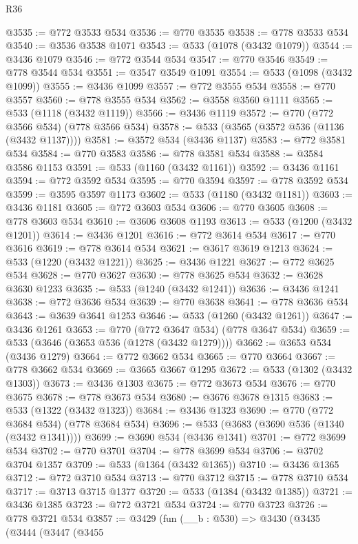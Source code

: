 \begin{lexlean}{R36}
\begin{coremodule}
@3535 := @772 @3533 @534
@3536 := @770 @3535
@3538 := @778 @3533 @534
@3540 := @3536 @3538 @1071
@3543 := @533 (@1078 (@3432 @1079))
@3544 := @3436 @1079
@3546 := @772 @3544 @534
@3547 := @770 @3546
@3549 := @778 @3544 @534
@3551 := @3547 @3549 @1091
@3554 := @533 (@1098 (@3432 @1099))
@3555 := @3436 @1099
@3557 := @772 @3555 @534
@3558 := @770 @3557
@3560 := @778 @3555 @534
@3562 := @3558 @3560 @1111
@3565 := @533 (@1118 (@3432 @1119))
@3566 := @3436 @1119
@3572 := @770 (@772 @3566 @534) (@778 @3566 @534)
@3578 := @533 (@3565 (@3572 @536 (@1136 (@3432 @1137))))
@3581 := @3572 @534 (@3436 @1137)
@3583 := @772 @3581 @534
@3584 := @770 @3583
@3586 := @778 @3581 @534
@3588 := @3584 @3586 @1153
@3591 := @533 (@1160 (@3432 @1161))
@3592 := @3436 @1161
@3594 := @772 @3592 @534
@3595 := @770 @3594
@3597 := @778 @3592 @534
@3599 := @3595 @3597 @1173
@3602 := @533 (@1180 (@3432 @1181))
@3603 := @3436 @1181
@3605 := @772 @3603 @534
@3606 := @770 @3605
@3608 := @778 @3603 @534
@3610 := @3606 @3608 @1193
@3613 := @533 (@1200 (@3432 @1201))
@3614 := @3436 @1201
@3616 := @772 @3614 @534
@3617 := @770 @3616
@3619 := @778 @3614 @534
@3621 := @3617 @3619 @1213
@3624 := @533 (@1220 (@3432 @1221))
@3625 := @3436 @1221
@3627 := @772 @3625 @534
@3628 := @770 @3627
@3630 := @778 @3625 @534
@3632 := @3628 @3630 @1233
@3635 := @533 (@1240 (@3432 @1241))
@3636 := @3436 @1241
@3638 := @772 @3636 @534
@3639 := @770 @3638
@3641 := @778 @3636 @534
@3643 := @3639 @3641 @1253
@3646 := @533 (@1260 (@3432 @1261))
@3647 := @3436 @1261
@3653 := @770 (@772 @3647 @534) (@778 @3647 @534)
@3659 := @533 (@3646 (@3653 @536 (@1278 (@3432 @1279))))
@3662 := @3653 @534 (@3436 @1279)
@3664 := @772 @3662 @534
@3665 := @770 @3664
@3667 := @778 @3662 @534
@3669 := @3665 @3667 @1295
@3672 := @533 (@1302 (@3432 @1303))
@3673 := @3436 @1303
@3675 := @772 @3673 @534
@3676 := @770 @3675
@3678 := @778 @3673 @534
@3680 := @3676 @3678 @1315
@3683 := @533 (@1322 (@3432 @1323))
@3684 := @3436 @1323
@3690 := @770 (@772 @3684 @534) (@778 @3684 @534)
@3696 := @533 (@3683 (@3690 @536 (@1340 (@3432 @1341))))
@3699 := @3690 @534 (@3436 @1341)
@3701 := @772 @3699 @534
@3702 := @770 @3701
@3704 := @778 @3699 @534
@3706 := @3702 @3704 @1357
@3709 := @533 (@1364 (@3432 @1365))
@3710 := @3436 @1365
@3712 := @772 @3710 @534
@3713 := @770 @3712
@3715 := @778 @3710 @534
@3717 := @3713 @3715 @1377
@3720 := @533 (@1384 (@3432 @1385))
@3721 := @3436 @1385
@3723 := @772 @3721 @534
@3724 := @770 @3723
@3726 := @778 @3721 @534
@3857 := @3429
    (fun (__b : @530) =>
    @3430
      (@3435
        (@3444
          (@3447
            (@3455

\end{coremodule}
\end{lexlean}
